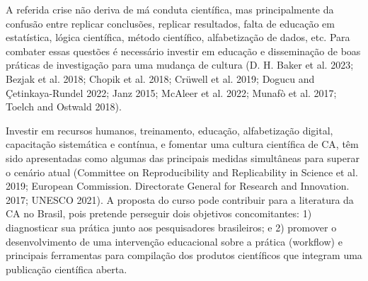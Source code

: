 \documentclass[
  a4paper,
]{article}
\begin{document}
A referida crise não deriva de má conduta científica, mas principalmente
da confusão entre replicar conclusões, replicar resultados, falta de
educação em estatística, lógica científica, método científico,
alfabetização de dados, etc. Para combater essas questões é necessário
investir em educação e disseminação de boas práticas de investigação
para uma mudança de cultura (D. H. Baker et al. 2023; Bezjak et al.
2018; Chopik et al. 2018; Crüwell et al. 2019; Dogucu and
Çetinkaya-Rundel 2022; Janz 2015; McAleer et al. 2022; Munafò et al.
2017; Toelch and Ostwald 2018).

Investir em recursos humanos, treinamento, educação, alfabetização
digital, capacitação sistemática e contínua, e fomentar uma cultura
científica de CA, têm sido apresentadas como algumas das principais
medidas simultâneas para superar o cenário atual (Committee on
Reproducibility and Replicability in Science et al. 2019; European
Commission. Directorate General for Research and Innovation. 2017;
UNESCO 2021). A proposta do curso pode contribuir para a literatura da
CA no Brasil, pois pretende perseguir dois objetivos concomitantes: 1)
diagnosticar sua prática junto aos pesquisadores brasileiros; e 2)
promover o desenvolvimento de uma intervenção educacional sobre a
prática (workflow) e principais ferramentas para compilação dos produtos
científicos que integram uma publicação científica aberta.
\end{document}
